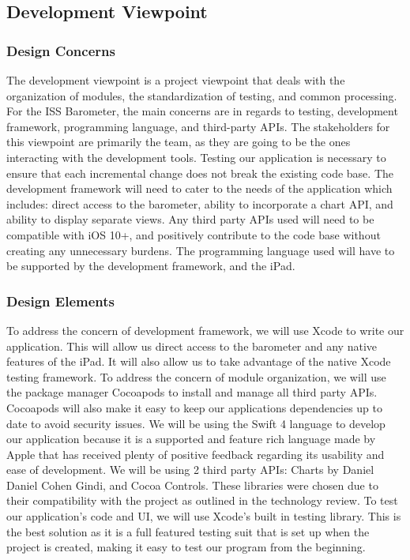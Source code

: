 \documentclass[onecolumn, draftclsnofoot,10pt, compsoc]{IEEEtran}
\begin{document}
\subsection{Development Viewpoint}
\subsubsection{Design Concerns}
The development viewpoint is a project viewpoint that deals with the organization of modules, the standardization of testing, and common processing.
For the ISS Barometer, the main concerns are in regards to testing, development framework, programming language, and third-party APIs.
The stakeholders for this viewpoint are primarily the team, as they are going to be the ones interacting with the development tools.
Testing our application is necessary to ensure that each incremental change does not break the existing code base.
The development framework will need to cater to the needs of the application which includes: direct access to the barometer, ability to incorporate a chart API, and ability to display separate views.
Any third party APIs used will need to be compatible with iOS 10+, and positively contribute to the code base without creating any unnecessary burdens.
The programming language used will have to be supported by the development framework, and the iPad.

\subsubsection{Design Elements}
To address the concern of development framework, we will use Xcode to write our application.
This will allow us direct access to the barometer and any native features of the iPad.
It will also allow us to take advantage of the native Xcode testing framework.
To address the concern of module organization, we will use the package manager Cocoapods to install and manage all third party APIs.
Cocoapods will also make it easy to keep our applications dependencies up to date to avoid security issues.
We will be using the Swift 4 language to develop our application because it is a supported and feature rich language made by Apple that has received plenty of positive feedback regarding its usability and ease of development.
We will be using 2 third party APIs: Charts by Daniel Daniel Cohen Gindi, and Cocoa Controls.
These libraries were chosen due to their compatibility with the project as outlined in the technology review.
To test our application's code and UI, we will use Xcode's built in testing library.
This is the best solution as it is a full featured testing suit that is set up when the project is created, making it easy to test our program from the beginning.
\end{document}
